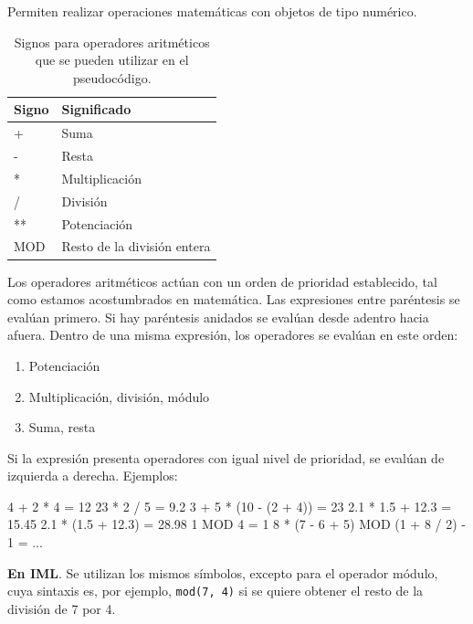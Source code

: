 \documentclass[
]{book}
\newenvironment{Shaded}{\begin{snugshade}}{\end{snugshade}}
\newcommand{\NormalTok}[1]{#1}
\providecommand{\tightlist}{%
  \setlength{\itemsep}{0pt}\setlength{\parskip}{0pt}}
\begin{document}
Permiten realizar operaciones matemáticas con objetos de tipo numérico.

\begin{table}

\caption{\label{tab:unnamed-chunk-12}Signos para operadores aritméticos que se pueden utilizar en el pseudocódigo.}
\centering
\begin{tabular}[t]{l|l}
\hline
Signo & Significado\\
\hline
+ & Suma\\
\hline
- & Resta\\
\hline
* & Multiplicación\\
\hline
/ & División\\
\hline
** & Potenciación\\
\hline
MOD & Resto de la división entera\\
\hline
\end{tabular}
\end{table}

Los operadores aritméticos actúan con un orden de prioridad establecido, tal como estamos acostumbrados en matemática. Las expresiones entre paréntesis se evalúan primero. Si hay paréntesis anidados se evalúan desde adentro hacia afuera. Dentro de una misma expresión, los operadores se evalúan en este orden:

\begin{enumerate}
\def\labelenumi{\arabic{enumi}.}
\tightlist
\item
  Potenciación
\item
  Multiplicación, división, módulo
\item
  Suma, resta
\end{enumerate}

Si la expresión presenta operadores con igual nivel de prioridad, se evalúan de izquierda a derecha. Ejemplos:

\begin{Shaded}
\begin{Highlighting}[]
\NormalTok{4 + 2 * 4 = 12}
\NormalTok{23 * 2 / 5 = 9.2}
\NormalTok{3 + 5 * (10 {-} (2 + 4)) = 23}
\NormalTok{2.1 * 1.5 + 12.3 = 15.45}
\NormalTok{2.1 * (1.5 + 12.3) = 28.98}
\NormalTok{1 MOD 4 = 1}
\NormalTok{8 * (7 {-} 6 + 5) MOD (1 + 8 / 2) {-} 1 = ...}
\end{Highlighting}
\end{Shaded}

\textbf{En IML}. Se utilizan los mismos símbolos, excepto para el operador módulo, cuya sintaxis es, por ejemplo, \texttt{mod(7,\ 4)} si se quiere obtener el resto de la división de 7 por 4.
\end{document}
